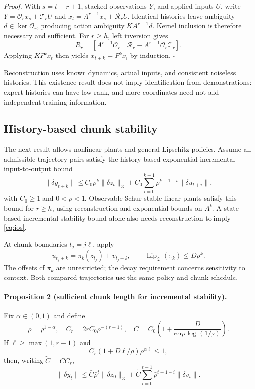 \documentclass{l4dc2026}
\newcommand{\norm}[1]{\lVert#1\rVert}
\begin{document}
\emph{Proof.} With $s=t-r+1$, stacked observations $Y$, and applied inputs $U$, write $Y=\mathcal O_rx_s+\mathcal T_rU$ and $x_t=A^{r-1}x_s+\mathcal R_rU$. Identical histories leave ambiguity $d\in\ker\mathcal O_r$, producing action ambiguity $KA^{r-1}d$. Kernel inclusion is therefore necessary and sufficient. For $r\ge h$, left inversion gives
\[
R_r=[A^{r-1}\mathcal O_r^\dagger\quad
\mathcal R_r-A^{r-1}\mathcal O_r^\dagger\mathcal T_r].
\]
Applying $KF^kx_t$ then yields $x_{t+k}=F^kx_t$ by induction. $\square$

Reconstruction uses known dynamics, actual inputs, and consistent noiseless histories. This existence result does not imply identification from demonstrations: expert histories can have low rank, and more coordinates need not add independent training information.

\subsection{History-based chunk stability}
The next result allows nonlinear plants and general Lipschitz policies. Assume all admissible trajectory pairs satisfy the history-based exponential incremental input-to-output bound
\begin{equation}\label{eq:ios}
\norm{\delta y_{t+k}}\le C_0\rho^k\norm{\delta z_t}_{\mathcal Z}
+C_0\sum_{i=0}^{k-1}\rho^{k-1-i}\norm{\delta u_{t+i}},
\end{equation}
with $C_0\ge1$ and $0<\rho<1$. Observable Schur-stable linear plants satisfy this bound for $r\ge h$, using reconstruction and exponential bounds on $A^k$. A state-based incremental stability bound alone also needs reconstruction to imply \eqref{eq:ios}.

At chunk boundaries $t_j=j\ell$, apply
\[
u_{t_j+k}=\pi_k(z_{t_j})+v_{t_j+k},\qquad
\operatorname{Lip}_{\mathcal Z}(\pi_k)\le D\rho^k.
\]
The offsets of $\pi_k$ are unrestricted; the decay requirement concerns sensitivity to context. Both compared trajectories use the same policy and chunk schedule.

\paragraph{Proposition 2 (sufficient chunk length for incremental stability).}
Fix $\alpha\in(0,1)$ and define
\[
\bar\rho=\rho^{1-\alpha},\quad C_r=2rC_0\rho^{-(r-1)},\quad
\bar C=C_0\left(1+\frac{D}{e\alpha\rho\log(1/\rho)}\right).
\]
If $\ell\ge\max(1,r-1)$ and
\begin{equation}\label{eq:criterion}
C_r(1+D\ell/\rho)\rho^{\alpha\ell}\le1,
\end{equation}
then, writing $\widetilde C=\bar CC_r$,
\begin{equation}\label{eq:closed}
\norm{\delta y_t}\le\bar C\bar\rho^t\norm{\delta z_0}_{\mathcal Z}
+\widetilde C\sum_{i=0}^{t-1}\bar\rho^{t-1-i}\norm{\delta v_i}.
\end{equation}
\end{document}
